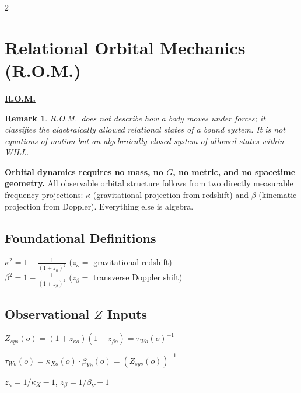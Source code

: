\documentclass[10pt, a4paper]{article}
\newtheorem{remark}[theorem]{Remark}
\begin{document}
\begin{multicols}{2}

\section{Relational Orbital Mechanics (R.O.M.)}
\hypertarget{sec:rom}{}\label{sec:rom}

\begin{tcolorbox}[colback=gray!5, colframe=black!80!black, title=Desmos Project]
\textbf{\href{https://www.desmos.com/calculator/n4lmkpsebx}{R.O.M.}}
\end{tcolorbox}
\hypertarget{eq:rom}{}\label{eq:rom}

\begin{remark}
R.O.M.\ does not describe how a body moves under forces; it classifies the algebraically allowed relational states of a bound system. It is not equations of motion but an algebraically closed system of allowed states within WILL.
\end{remark}

\textbf{Orbital dynamics requires no mass, no $G$, no metric, and no spacetime geometry.} All observable orbital structure follows from two directly measurable frequency projections: $\kappa$ (gravitational projection from redshift) and $\beta$ (kinematic projection from Doppler). Everything else is algebra.

\subsection{Foundational Definitions}

$\boxed{\kappa^2 = 1-\frac{1}{(1+z_{\kappa})^2}}$ \quad ($z_{\kappa}=$ gravitational redshift) \\[3pt]
$\boxed{\beta^2=1-\frac{1}{(1+z_{\beta})^{2}}}$ \quad ($z_{\beta}=$ transverse Doppler shift)

\subsection{Observational $Z$ Inputs}

$Z_{sys}(o)=(1+z_{\kappa o})(1+z_{\beta o})=\tau_{Wo}(o)^{-1}$

$\tau_{Wo}(o)=\kappa_{Xo}(o)\cdot\beta_{Yo}(o)=(Z_{sys}(o))^{-1}$

$z_{\kappa} = 1/\kappa_{X}-1$, \quad $z_{\beta}=1/\beta_{Y}-1$


\end{multicols}
\end{document}
